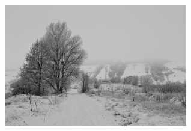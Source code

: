 \vfill

\begin{center}
\includegraphics[keepaspectratio,width=0.6\textwidth]{immagini/blizzard.png}

\end{center}

\pagebreak
